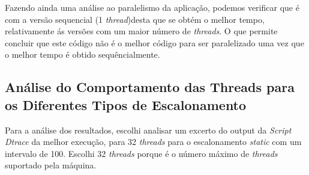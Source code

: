 \documentclass[conference,compsoc]{IEEEtran}
\begin{document}
Fazendo ainda uma análise ao paralelismo da aplicação, podemos verificar que é com a versão sequencial (1 \textit{thread})desta que se obtém o melhor tempo, relativamente ás versões com um maior número de \textit{threads}. O que permite concluir que este código não é o melhor código para ser paralelizado uma vez que o melhor tempo é obtido sequêncialmente. 

\subsection{Análise do Comportamento das Threads para os Diferentes Tipos de Escalonamento}

Para a análise dos resultados, escolhi analisar um excerto do output da \textit{Script Dtrace} da melhor execução, para 32 \textit{threads} para o escalonamento \textit{static} com um intervalo de 100. Escolhi 32 \textit{threads} porque é o número máximo de \textit{threads} suportado pela máquina.
\end{document}
